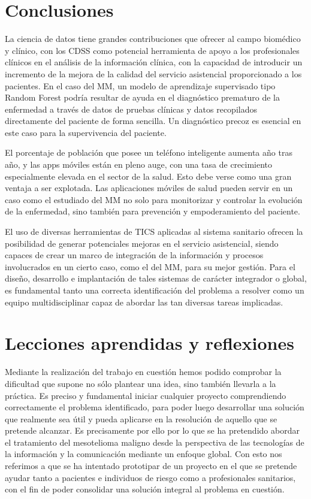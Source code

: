 \documentclass{article}
\begin{document}
\section{Conclusiones}


La ciencia de datos tiene grandes contribuciones que ofrecer al  campo
biomédico y clínico, con los CDSS como potencial herramienta de  apoyo
a los profesionales clínicos en el análisis de la información clínica,
con la capacidad de introducir	un  incremento	de  la	mejora	de  la
calidad del servicio asistencial proporcionado a los pacientes.  En el
caso del MM, un modelo de aprendizaje supervisado tipo	Random	Forest
podría resultar de ayuda en el diagnóstico prematuro de la  enfermedad
a través de datos de pruebas clínicas y datos recopilados directamente
del paciente de forma sencilla.  Un diagnóstico precoz es esencial  en
este caso para la supervivencia del paciente.

El porcentaje de población que posee un teléfono  inteligente  aumenta
año tras año, y las apps móviles están en pleno auge, con una tasa  de
crecimiento especialmente elevada en el sector de la salud.  Esto debe
verse como una gran ventaja a ser explotada.  Las aplicaciones móviles
de salud pueden servir en un caso como el estudiado  del  MM  no  solo
para monitorizar y controlar  la  evolución  de  la  enfermedad,  sino
también   para	 prevención    y    empoderamiento    del    paciente.

El uso de diversas herramientas de TICS aplicadas al sistema sanitario
ofrecen la posibilidad de generar potenciales mejoras en  el  servicio
asistencial, siendo capaces de crear un marco  de  integración	de  la
información y procesos involucrados en un cierto caso, como el del MM,
para su mejor gestión.	Para el diseño, desarrollo e  implantación  de
tales sistemas de carácter integrador o global, es  fundamental  tanto
una correcta identificación del problema a  resolver  como  un	equipo
multidisciplinar capaz de abordar las tan diversas tareas  implicadas.

\section{Lecciones aprendidas y reflexiones}

Mediante la realización del trabajo en cuestión hemos podido comprobar
la dificultad que supone no  sólo  plantear  una  idea,  sino  también
llevarla a la práctica.  Es preciso y  fundamental  iniciar  cualquier
proyecto comprendiendo correctamente el  problema  identificado,  para
poder luego desarrollar una solución que realmente sea	útil  y  pueda
aplicarse en la resolución de aquello que se  pretende	alcanzar.   Es
precisamente  por  ello  por  lo  que  se  ha  pretendido  abordar  el
tratamiento del  mesotelioma  maligno  desde  la  perspectiva  de  las
tecnologías de la información y la comunicación  mediante  un  enfoque
global.  Con esto nos referimos a que se ha intentado prototipar de un
proyecto en el que se pretende ayudar tanto a pacientes  e  individuos
de riesgo como	a  profesionales  sanitarios,  con  el	fin  de  poder
consolidar  una   solución   integral	al   problema	en   cuestión.
\end{document}
